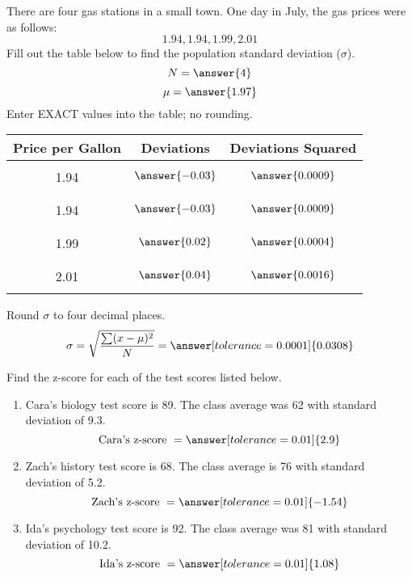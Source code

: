 \documentclass{ximera}
\begin{document}
\begin{problem}\label{prob:140hom3prob2}
There are four gas stations in a small town.  One day in July, the gas prices were as follows:
$$1.94, 1.94, 1.99, 2.01$$
Fill out the table below to find the population standard deviation ($\sigma$).
$$N=\answer{4}$$
$$\mu=\answer{1.97}$$
Enter EXACT values into the table; no rounding.
\begin{center}
\begin{tabular}{|c|c|c|}
Price per Gallon & Deviations & Deviations Squared  \\
 \hline
 \hline
   & &\\
 1.94 &$\answer{-0.03}$  & $\answer{0.0009}$ \\
  & &\\
  \hline
   & &\\
 1.94 &$\answer{-0.03}$  & $\answer{0.0009}$\\
  & &\\
 \hline
  & &\\
 1.99 &$\answer{0.02}$ &$\answer{0.0004}$ \\
  & &\\
 \hline
  & &\\
 2.01 &$\answer{0.04}$  &$\answer{0.0016}$ \\
  & &\\
 \hline
 
\end{tabular}
\end{center}
Round $\sigma$ to four decimal places.
$$\sigma =\sqrt{\frac{\sum (x-\mu)^2}{N}}=\answer[tolerance=0.0001]{0.0308}$$
\end{problem}

\begin{problem}\label{prob:140hom3prob5}
Find the z-score for each of the test scores listed below.
\begin{enumerate}
    \item Cara's biology test score is 89.  The class average was 62 with standard deviation of 9.3.
    $$\mbox{Cara's z-score }=\answer[tolerance=0.01]{2.9}$$
    \item Zach's history test score is 68.  The class average is 76 with standard deviation of 5.2.
    $$\mbox{Zach's z-score }=\answer[tolerance=0.01]{-1.54}$$
    \item Ida's psychology test score is 92.  The class average was 81 with standard deviation of 10.2.
    $$\mbox{Ida's z-score }=\answer[tolerance=0.01]{1.08}$$
    
\end{enumerate}
\end{problem}
\end{document}
